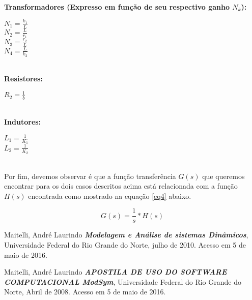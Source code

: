 \documentclass[12pt]{report}
\begin{document}
\textbf {\\Transformadores (Expresso em função de seu respectivo ganho $N_k$):}\\
	\begin{center}
	$N_1=\frac{k_1}{L}$\\ 
	$N_2=\frac{L}{r_1}$ \\
	$N_3=\frac{r_2}{L}$ \\
	$N_4=\frac{L}{k_2}$
	\end{center}
\hline
\hline

\textbf {\\Resistores:}
	\begin{center}
	$R_2=\frac{1}{b}$\\ 
	\end{center}
	\hline
	\hline

\textbf {\\Indutores:}
	\begin{center}
	$L_1=\frac{1}{K_1}$\\ 
	$L_2=\frac{1}{K_2}$ 
	\end{center}
	\hline
	\hline
\indent \\

\indent Por fim, devemos observar é que a função transferência $G(s)$ que queremos encontrar para os dois casos descritos acima está relacionada com a função $H(s)$ encontrada como mostrado na equação \ref{eq4} abaixo.

\begin{equation} \label{eq4}
G(s) = \frac{1}{s} * H(s)
\end{equation}

\begin{thebibliography}{unsrt}

  Maitelli, André Laurindo 
  \emph{\bfseries Modelagem e Análise de sistemas Dinâmicos},
  Universidade Federal do Rio Grande do Norte, julho de 2010. 
  Acesso em 5 de maio de 2016.
  
  
  Maitelli, André Laurindo 
  \emph{\bfseries APOSTILA DE USO DO SOFTWARE COMPUTACIONAL ModSym},
  Universidade Federal do Rio Grande do Norte, Abril de 2008. 
  Acesso em 5 de maio de 2016.
  

\end{thebibliography}
\end{document}
